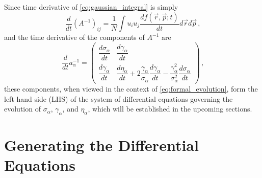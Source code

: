 Since time derivative of \ref{eq:gaussian_integral} is simply
\begin{equation} \label{eq:gaussian_integral_dt}
  \frac{d}{dt}(A^{-1})_{ij} = \frac{1}{N} \int u_i u_j \frac{df(\vec{r}, \vec{p}; t)}{dt} d\vec{r} d\vec{p} \,\text{,}
\end{equation}
and the time derivative of the components of $A^{-1}$ are
\begin{equation} \label{eq:dainvdt}
  \frac{d}{dt} a^{-1}_{\alpha} = 
  \begin{pmatrix}
    \dfrac{d\sigma_{\alpha}}{dt} & \dfrac{d\gamma_{\alpha}}{dt} \\
    \dfrac{d\gamma_{\alpha}}{dt} & \dfrac{d\eta_{\alpha}}{dt} + 2\dfrac{\gamma_{\alpha}}{\sigma_{\alpha}}\dfrac{d\gamma_{\alpha}}{dt}- \dfrac{\gamma^{2}_{\alpha}}{\sigma^{2}_{\alpha}}\dfrac{d\sigma_{\alpha}}{dt}
  \end{pmatrix} \,\text{,}
\end{equation}
these components, when viewed in the context of \ref{eq:formal_evolution}, form the left hand side (LHS) of the system of differential equations governing the evolution of $\sigma_{\alpha}$, $\gamma_{\alpha}$, and $\eta_{\alpha}$, which will be established in the upcoming sections.

\section{Generating the Differential Equations}

